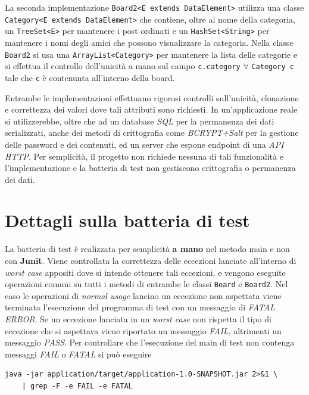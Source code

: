 \documentclass[12pt]{report}
\begin{document}
La seconda implementazione \verb|Board2<E extends DataElement>| utilizza una classe
\verb|Category<E extends DataElement>| che contiene, oltre al nome
della categoria, un \verb|TreeSet<E>| per mantenere i post ordinati e
un \verb|HashSet<String>| per mantenere i nomi degli amici che possono visualizzare la categoria.
Nella classe \verb|Board2| si usa una \verb|ArrayList<Category>| per mantenere la lista delle categorie e si effettua il
controllo dell'unicità a mano sul campo \verb|c.category| $\forall$ \verb|Category c| tale che \verb|c| è contenunta all'interno
della board.

Entrambe le implementazioni effettuano rigorosi controlli sull'unicità, clonazione e correttezza dei valori dove tali attributi sono richiesti.
In un'applicazione reale si utilizzerebbe, oltre che ad un database \textit{SQL} per la permanenza dei dati serializzati, anche dei
metodi di crittografia come \textit{BCRYPT+Salt} per la gestione delle password e dei contenuti, ed un server che espone endpoint di una \textit{API HTTP}.
Per semplicità, il progetto non richiede nessuna di tali funzionalità e l'implementazione e la batteria di test non gestiscono crittografia o permanenza dei dati.

\section{Dettagli sulla batteria di test}
La batteria di test è realizzata per semplicità \textbf{a mano} nel metodo main
e non con \textbf{Junit}. Viene controllata la correttezza delle eccezioni lanciate all'interno
di \textit{worst case} appositi dove si intende ottenere tali eccezioni, e vengono eseguite operazioni comuni
su tutti i metodi di entrambe le classi \verb|Board| e \verb|Board2|. Nel caso le operazioni
di \textit{normal usage} lancino un eccezione non aspettata viene terminata l'esecuzione del programma di test con un messaggio
di \textit{FATAL ERROR}. Se un eccezione lanciata in un \textit{worst case}
non rispetta il tipo di eccezione che si aspettava viene riportato un messaggio \textit{FAIL}, altrimenti un messaggio \textit{PASS}. Per controllare che l'esecuzione del main di test non contenga messaggi \textit{FAIL} o \textit{FATAL} si può eseguire

\begin{lstlisting}[style=bash]
java -jar application/target/application-1.0-SNAPSHOT.jar 2>&1 \
	| grep -F -e FAIL -e FATAL
\end{lstlisting}

\appendix

%
%
\end{document}

